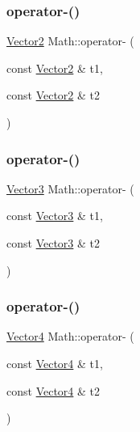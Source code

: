\mbox{\label{namespace_math_a3c1ebbbebd6020556b1cdd7ebe1ee1a5}} 
\subsubsection{\texorpdfstring{operator-\/()}{operator-()}\hspace{0.1cm}{\footnotesize\ttfamily [1/6]}}
{\footnotesize\ttfamily \mbox{\hyperlink{struct_math_1_1_vector2}{Vector2}} Math\+::operator-\/ (\begin{DoxyParamCaption}\item[{const \mbox{\hyperlink{struct_math_1_1_vector2}{Vector2}} \&}]{t1,  }\item[{const \mbox{\hyperlink{struct_math_1_1_vector2}{Vector2}} \&}]{t2 }\end{DoxyParamCaption})}

\mbox{\label{namespace_math_a99d6a8ff14fa83d33520f7f3f717877c}} 
\subsubsection{\texorpdfstring{operator-\/()}{operator-()}\hspace{0.1cm}{\footnotesize\ttfamily [2/6]}}
{\footnotesize\ttfamily \mbox{\hyperlink{struct_math_1_1_vector3}{Vector3}} Math\+::operator-\/ (\begin{DoxyParamCaption}\item[{const \mbox{\hyperlink{struct_math_1_1_vector3}{Vector3}} \&}]{t1,  }\item[{const \mbox{\hyperlink{struct_math_1_1_vector3}{Vector3}} \&}]{t2 }\end{DoxyParamCaption})}

\mbox{\label{namespace_math_ae164bf95185127aeb0d140f15718e10a}} 
\subsubsection{\texorpdfstring{operator-\/()}{operator-()}\hspace{0.1cm}{\footnotesize\ttfamily [3/6]}}
{\footnotesize\ttfamily \mbox{\hyperlink{struct_math_1_1_vector4}{Vector4}} Math\+::operator-\/ (\begin{DoxyParamCaption}\item[{const \mbox{\hyperlink{struct_math_1_1_vector4}{Vector4}} \&}]{t1,  }\item[{const \mbox{\hyperlink{struct_math_1_1_vector4}{Vector4}} \&}]{t2 }\end{DoxyParamCaption})}

